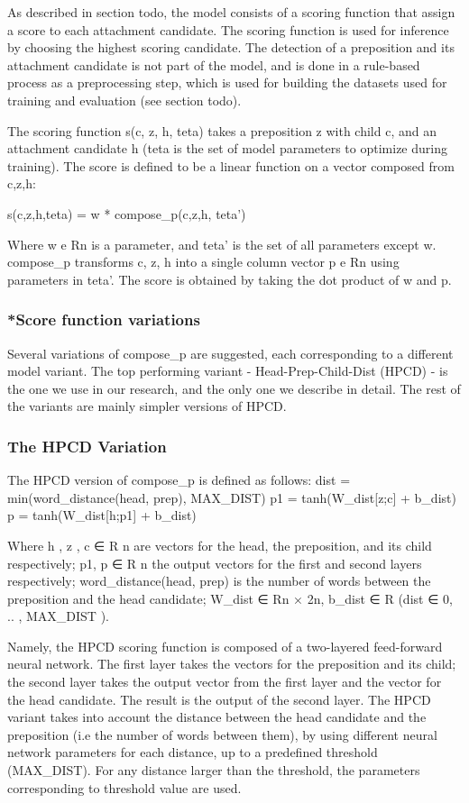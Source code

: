 As described in section todo, the model consists of a scoring function that assign a score to each attachment candidate. The scoring function is used for inference by choosing the highest scoring candidate. The detection of a preposition and its attachment candidate is not part of the model, and is done in a rule-based process as a preprocessing step, which is used for building the datasets used for training and evaluation (see section todo).

The scoring function s(c, z, h, teta) takes a preposition z with child c, and an attachment candidate h (teta is the set of model parameters to optimize during training). The score is defined to be a linear function on a vector composed from c,z,h:

s(c,z,h,teta) = w * compose\_p(c,z,h, teta’)

Where w e Rn is a parameter, and teta' is the set of all parameters except w. compose\_p transforms c, z, h into a single column vector p e Rn using parameters in teta’.  The score is obtained by taking the dot product of w and p. 

\subsubsection{*Score function variations}
Several variations of compose\_p are suggested, each corresponding to a different model variant. The top performing variant - Head-Prep-Child-Dist (HPCD) - is the one we use in our research, and the only one we describe in detail. The rest of the variants are mainly simpler versions of HPCD.

\subsubsection{The HPCD Variation}
The HPCD version of compose\_p is defined as follows:
   dist = min(word\_distance(head, prep), MAX\_DIST)
   p1 = tanh(W\_dist[z;c] + b\_dist)   
   p = tanh(W\_dist[h;p1] + b\_dist)

Where h , z , c ∈ R n are  vectors  for  the  head,  the  preposition,  and its  child respectively; p1, p ∈ R n the output vectors for the first and second layers respectively;
word\_distance(head, prep) is the number of words between the preposition and the head candidate; W\_dist ∈ Rn × 2n, b\_dist ∈ R (dist ∈ {0, .. , MAX\_DIST} ). 

Namely, the HPCD scoring function is composed of a two-layered feed-forward neural network. The first layer takes the vectors for the preposition and its child; the second layer takes the output vector from the first layer and the vector for the head candidate. The result is the output of the second layer. The HPCD variant takes into account the distance between the head candidate and the preposition (i.e the number of words between them), by using different neural network parameters for each distance, up to a predefined threshold (MAX\_DIST). For any distance larger than the threshold, the parameters corresponding to threshold value are used.

